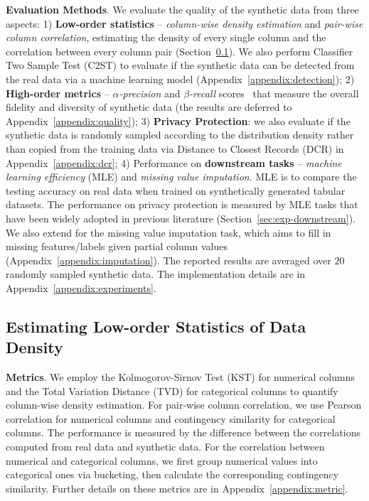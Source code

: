 \textbf{Evaluation Methods}. We evaluate the quality of the synthetic data from three aspects: 1) \textbf{Low-order statistics} -- \emph{column-wise density estimation} and \emph{pair-wise column correlation}, estimating the density of every single column and the correlation between every column pair (Section~\ref{sec:exp-low-order}). We also perform Classifier Two Sample Test (C2ST) to evaluate if the synthetic data can be detected from the real data via a machine learning model (Appendix~\ref{appendix:detection}); 2) \textbf{High-order metrics} -- \emph{$\alpha$-precision} and \emph{$\beta$-recall} scores~\citep{faithful} that measure the overall fidelity and diversity of synthetic data (the results are deferred to Appendix~\ref{appendix:quality}); 3) \textbf{Privacy Protection}: we also evaluate if the synthetic data is randomly sampled according to the distribution density rather than copied from the training data via Distance to Closest Records (DCR) in Appendix~\ref{appendix:dcr}; 4) Performance on \textbf{downstream tasks} -- \emph{machine learning efficiency} (MLE) and \emph{missing value imputation}. MLE is to compare the testing accuracy on real data when trained on synthetically generated tabular datasets. The performance on {privacy protection} is measured by MLE tasks that have been widely adopted in previous literature (Section~\ref{sec:exp-downstream}). We also extend \modelname for the missing value imputation task, which aims to fill in missing features/labels given partial column values (Appendix~\ref{appendix:imputation}). The reported results are averaged over $20$ randomly sampled synthetic data. The implementation details are in Appendix~\ref{appendix:experiments}.

\subsection{Estimating Low-order Statistics of Data Density}\label{sec:exp-low-order}

\textbf{Metrics}.  We employ the Kolmogorov-Sirnov Test (KST) for numerical columns and the Total Variation Distance (TVD) for categorical columns to quantify column-wise density estimation. For pair-wise column correlation, we use Pearson correlation for numerical columns and contingency similarity for categorical columns. The performance is measured by the difference between the correlations computed from real data and synthetic data. For the correlation between numerical and categorical columns, we first group numerical values into categorical ones via bucketing, then calculate the corresponding contingency similarity. Further details on these metrics are in Appendix~\ref{appendix:metric}. 

